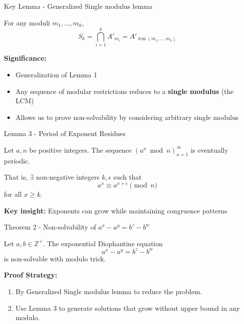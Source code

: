 \begin{frame}{Key Lemma - Generalized Single modulus lemma}
    \begin{lemmas}
        For any moduli $m_1,...,m_k$,
        \[S_k = \bigcap_{i=1}^k A'_{m_i} = A'_{\operatorname{lcm}(m_1,...,m_k)}\]
    \end{lemmas}
    
    \textbf{Significance:}
    \begin{itemize}
    \item  Generalization of Lemma 1
        \item Any sequence of modular restrictions reduces to a \textbf{single modulus} (the LCM)
        \item Allows us to prove non-solvability by considering arbitrary single modulus
    \end{itemize}
\end{frame}
\begin{frame}{Lemma 3 - Period of Exponent Residues}
    \begin{lemmas}
        Let $a,n$ be positive integers. The sequence $(a^x \bmod n)_{x=1}^\infty$ is eventually periodic.
        
        That is, $\exists$ non-negative integers $k,\epsilon$ such that
        \[a^x \equiv a^{x+\epsilon} \pmod n\]
        for all $x \geq k$.
    \end{lemmas}
    
    \textbf{Key insight:} Exponents can grow while maintaining congruence patterns
    
    
\end{frame}

\begin{frame}{Theorem 2 - Non-solvability of $a^x-a^y = b^z-b^w$}
    \begin{theorems}
        Let $a,b \in \mathbb{Z}^+$. The exponential Diophantine equation
        \[a^x - a^y = b^z - b^w\]
        is non-solvable with modulo trick.
    \end{theorems}
    
    \textbf{Proof Strategy:}
    \begin{enumerate}
        \item  By Generalized Single modulus lemma to reduce the problem.
        \item  Use Lemma 3 to generate solutions that grow without upper bound in any modulo.
    \end{enumerate}
\end{frame}

